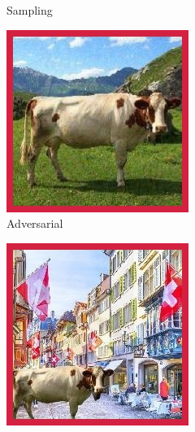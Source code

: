 \begin{figure}[H]
\begin{subfigure}[b]{0.22\textwidth}
        \caption{Sampling}
    \end{subfigure}
    \hfill
    \begin{subfigure}[b]{0.22\textwidth}
        \centering
        \includegraphics[width=\textwidth]{img/introduction/cow_fgsm.jpg}
        \caption{Adversarial}
    \end{subfigure}
    \hfill
    \begin{subfigure}[b]{0.22\textwidth}
        \centering
        \includegraphics[width=\textwidth]{img/introduction/cow_ood.jpg}

\end{subfigure}
\end{figure}
